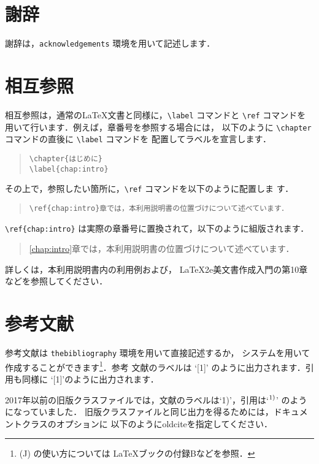 \documentclass[sotsuron]{kuee}
\begin{document}
\section{謝辞}
謝辞は，\verb+acknowledgements+ 環境を用いて記述します．

\section{相互参照}
\label{cross_reference}
相互参照は，通常の\LaTeX{}文書と同様に，\verb+\label+ コマンドと
\verb+\ref+ コマンドを用いて行います．例えば，章番号を参照する場合には，
以下のように \verb+\chapter+ コマンドの直後に \verb+\label+ コマンドを
配置してラベルを宣言します．
\begin{quote}
\begin{verbatim}
\chapter{はじめに}
\label{chap:intro}
\end{verbatim}
\end{quote}
その上で，参照したい箇所に，\verb+\ref+ コマンドを以下のように配置しま
す．
\begin{quote}
\begin{verbatim}
\ref{chap:intro}章では，本利用説明書の位置づけについて述べています．
\end{verbatim}
\end{quote}
\verb+\ref{chap:intro}+ は実際の章番号に置換されて，以下のように組版されます．
\begin{quote}
\ref{chap:intro}章では，本利用説明書の位置づけについて述べています．
\end{quote}
詳しくは，本利用説明書内の利用例および，
\LaTeX2e{}美文書作成入門\cite{GuideBook}の第10章などを参照してください．


\section{参考文献}
参考文献は \verb+thebibliography+ 環境を用いて直接記述するか，
\JBibTeX{} システムを用いて作成することができます\footnote{(J)\BibTeX 
の使い方については \LaTeX ブック\cite{LaTeX}の付録Bなどを参照．}．参考
文献のラベルは `[1]' のように出力されます．引用も同様に
`[1]'のように出力されます．

2017年以前の旧版クラスファイルでは，文献のラベルは`1)'，引用は`$^{\mbox{\scriptsize 1)}}$'
のようになっていました．
旧版クラスファイルと同じ出力を得るためには，ドキュメントクラスのオプションに
以下のように{\ttfamily oldcite}を指定してください．
\end{document}
